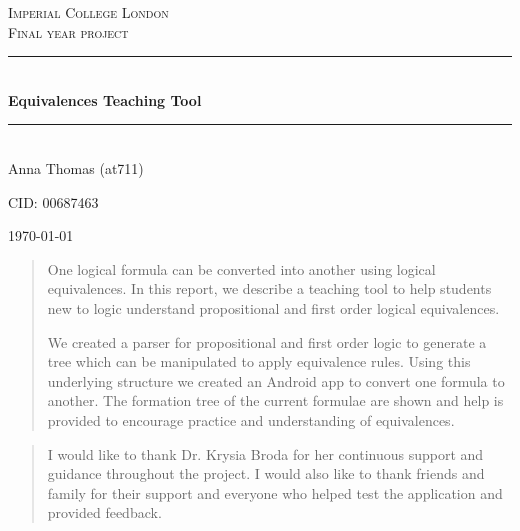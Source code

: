 \documentclass{report}
\newcommand{\HRule}{\rule{\linewidth}{0.5mm}}
\begin{document}
\expandafter\def\csname PY@tok@err\endcsname{}
\renewcommand{\abstractname}{\large Abstract}

\begin{titlepage}
\begin{center}

\textsc{\LARGE Imperial College London}\\[1.5cm]

\textsc{\Large Final year project}\\[0.5cm]

\HRule \\[0.4cm]
{ \huge \bfseries Equivalences Teaching Tool \\[0.4cm] }

\HRule \\[1.5cm]

Anna Thomas (at711)

CID: 00687463

\vfill

{\large \today}

\end{center}
\end{titlepage}

\begin{abstract}
One logical formula can be converted into another using logical equivalences. In this report, we describe a teaching tool to help students new to logic understand propositional and first order logical equivalences.

We created a parser for propositional and first order logic to generate a tree which can be manipulated to apply equivalence rules. Using this underlying structure we created an Android app to convert one formula to another. The formation tree of the current formulae are shown and help is provided to encourage practice and understanding of equivalences.

\end{abstract}

\renewcommand{\abstractname}{\large Acknowledgements}
\begin{abstract}
I would like to thank Dr. Krysia Broda for her continuous support and guidance throughout the project. I would also like to thank friends and family for their support and everyone who helped test the application and provided feedback.
\end{abstract}

\tableofcontents
\end{document}
